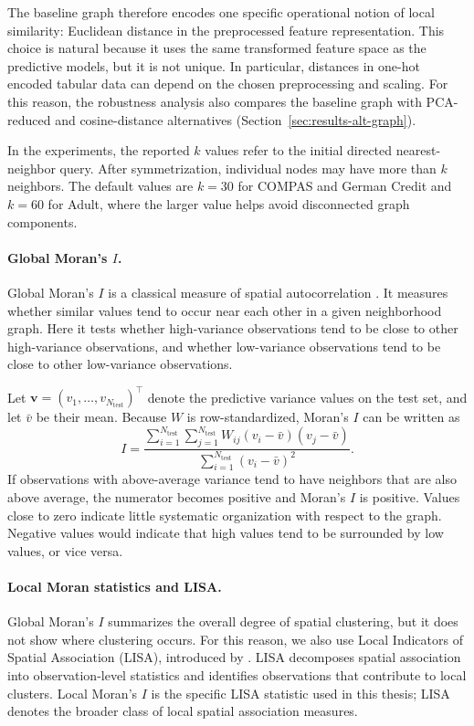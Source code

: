 The baseline graph therefore encodes one specific operational notion of local similarity:
Euclidean distance in the preprocessed feature representation. This choice is natural
because it uses the same transformed feature space as the predictive models, but it is not
unique. In particular, distances in one-hot encoded tabular data can depend on the chosen
preprocessing and scaling. For this reason, the robustness analysis also compares the
baseline graph with PCA-reduced and cosine-distance alternatives
(Section~\ref{sec:results-alt-graph}).

\label{sec:exp-knn-graph}
In the experiments, the reported $k$ values refer to the initial directed nearest-neighbor
query. After symmetrization, individual nodes may have more than $k$ neighbors. The
default values are $k=30$ for COMPAS and German Credit and $k=60$ for Adult, where
the larger value helps avoid disconnected graph components.

\paragraph{Global Moran's $I$.}
\label{sec:meth-moran}
Global Moran's $I$ is a classical measure of spatial autocorrelation \citep{moran1950notes}.
It measures whether similar values tend to occur near each other in a given neighborhood
graph. Here it tests whether high-variance observations tend to be close to other
high-variance observations, and whether low-variance observations tend to be close to
other low-variance observations.

Let $\mathbf{v}=(v_1,\dots,v_{N_{\mathrm{test}}})^\top$ denote the predictive variance values on the test set,
and let $\bar{v}$ be their mean. Because $W$ is row-standardized, Moran's $I$ can be
written as
\[
I =
\frac{\sum_{i=1}^{N_{\mathrm{test}}} \sum_{j=1}^{N_{\mathrm{test}}} W_{ij}(v_i-\bar{v})(v_j-\bar{v})}
{\sum_{i=1}^{N_{\mathrm{test}}} (v_i-\bar{v})^2}.
\]
If observations with above-average variance tend to have neighbors that are also above
average, the numerator becomes positive and Moran's $I$ is positive. Values close to zero
indicate little systematic organization with respect to the graph. Negative values would
indicate that high values tend to be surrounded by low values, or vice versa.

\paragraph{Local Moran statistics and LISA.}
\label{sec:meth-lisa}
Global Moran's $I$ summarizes the overall degree of spatial clustering, but it does not
show where clustering occurs. For this reason, we also use Local Indicators of Spatial
Association (LISA), introduced by \citet{anselin1995local}. LISA decomposes spatial
association into observation-level statistics and identifies observations that contribute to
local clusters. Local Moran's $I$ is the specific LISA statistic used in this thesis; LISA 
denotes the broader class of local spatial association measures.

